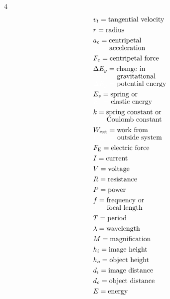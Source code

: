 \documentclass[dvipsnames]{article}
\begin{document}
\begin{multicols*}{4}
\begin{align*}
    & v_t = \text{tangential velocity} \\
    & r = \text{radius} \\
    & a_c = \text{centripetal} \\[-1ex]
    & \textcolor{white}{a_c =} \text{ acceleration} \\
    & F_c = \text{centripetal force} \\
    & \Delta E_g = \text{change in} \\[-1ex]
    & \textcolor{white}{\Delta E_g =} \text{ gravitational} \\[-1ex]
    & \textcolor{white}{\Delta E_g =} \text{ potential energy} \\
    & E_s = \text{spring or} \\[-1ex]
    & \textcolor{white}{E_s =} \text{ elastic energy} \\
    & k = \text{spring constant or} \\[-1ex]
    & \textcolor{white}{k =} \text{ Coulomb constant} \\
    & W_\mathrm{ext} = \text{work from} \\[-1ex]
    & \textcolor{white}{W_\mathrm{ext} =} \text{ outside system} \\
    & F_\mathrm{E} = \text{electric force} \\
    & I = \text{current} \\
    & V = \text{voltage} \\
    & R = \text{resistance} \\
    & P = \text{power} \\
    & f = \text{frequency or} \\[-1ex]
    & \textcolor{white}{f =} \text{ focal length} \\
    & T = \text{period} \\
    & \lambda = \text{wavelength} \\
    & M = \text{magnification} \\
    & h_i = \text{image height} \\
    & h_o = \text{object height} \\
    & d_i = \text{image distance} \\
    & d_o = \text{object distance} \\
    & E = \text{energy}
\end{align*}
\end{multicols*}

\clearpage





{}
\printnoidxglossaries
\end{document}
